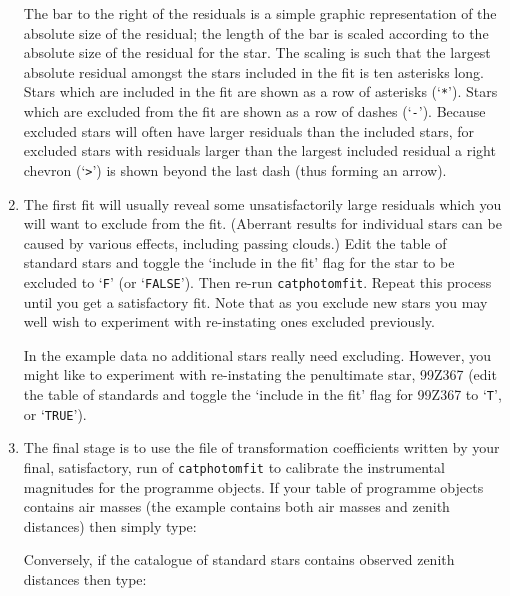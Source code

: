 \documentclass[twoside,11pt,nolof]{starlink}
\begin{document}
\begin{enumerate}
   The bar to the right of the residuals is a simple graphic
   representation of the absolute size of the residual; the length of the
   bar is scaled according to the absolute size of the residual for the
   star.  The scaling is such that the largest absolute residual amongst
   the stars included in the fit is ten asterisks long.  Stars which are
   included in the fit are shown as a row of asterisks (`\texttt{*}').  Stars
   which are excluded from the fit are shown as a row of dashes (`\texttt{-}').  Because excluded stars will often have larger residuals than the
   included stars, for excluded stars with residuals larger than the
   largest included residual a right chevron (`\verb->-') is shown beyond
   the last dash (thus forming an arrow).

  \item The first fit will usually reveal some unsatisfactorily large
   residuals which you will want to exclude from the fit.  (Aberrant
   results for individual stars can be caused by various effects, including
   passing clouds.)  Edit the table of standard stars and toggle the
   `include in the fit' flag for the star to be excluded to `\texttt{F}'
   (or `\texttt{FALSE}').  Then re-run \texttt{catphotomfit}.  Repeat this
   process until you get a satisfactory fit.  Note that as you exclude
   new stars you may well wish to experiment with re-instating ones
   excluded previously.

   In the example data no additional stars really need excluding.
   However, you might like to experiment with re-instating the
   penultimate star, 99Z367 (edit the table of standards and toggle the
   `include in the fit' flag for 99Z367 to `\texttt{T}', or `\texttt{TRUE}').

  \item The final stage is to use the file of transformation
   coefficients written by your final, satisfactory, run of \texttt{catphotomfit} to calibrate the instrumental magnitudes for the
   programme objects.  If your table of programme objects contains air
   masses (the example contains both air masses and zenith distances)
   then simply type:

\begin{terminalv}
\end{terminalv}

   Conversely, if the catalogue of standard stars contains observed
   zenith distances then type:

\begin{terminalv}
\end{terminalv}


\end{enumerate}
\end{document}

